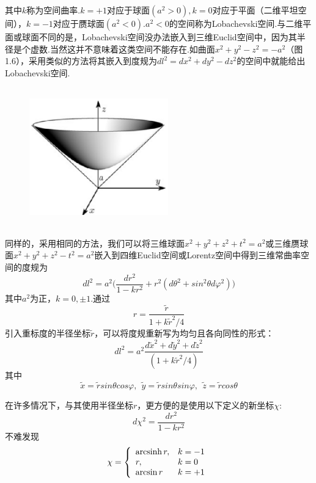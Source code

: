 \documentclass[a4paper]{book}
\begin{document}
其中$k$称为空间曲率.$k=+1$对应于球面$(a^2>0),$$k=0$对应于平面（二维平坦空间），$k=-1$对应于赝球面$(a^2<0)$.$a^2<0$的空间称为Lobachevski空间.与二维平面或球面不同的是，Lobachevski空间没办法嵌入到三维Euclid空间中，因为其半径是个虚数.当然这并不意味着这类空间不能存在.如曲面$x^2+y^2-z^2=-a^2$（图1.6），采用类似的方法将其嵌入到度规为$dl^2=dx^2+dy^2-dz^2$的空间中就能给出Lobachevski空间.
\begin{figure}[!h]
	\centering
	\includegraphics[width=6cm,height=6cm]{figures/双曲面.eps}
	\caption{}
\end{figure}\par 
同样的，采用相同的方法，我们可以将三维球面$x^2+y^2+z^2+t^2=a^2$或三维赝球面$x^2+y^2+z^2-t^2=a^2$嵌入到四维Euclid空间或Lorentz空间中得到三维常曲率空间的度规为
\begin{equation}\label{1.30}
	dl^2=a^2\Big(\frac{dr^2}{1-kr^2}+r^2(d\theta^2+sin^2\theta d\varphi^2)\Big)
\end{equation}
其中$a^2$为正，$k=0,\pm1$.通过
\begin{equation}
	r=\frac{\tilde{r}}{1+k\tilde{r}^2/4}
\end{equation}
引入重标度的半径坐标$\tilde{r}$，可以将度规重新写为均匀且各向同性的形式：
\begin{equation}
	dl^2=a^2\frac{d\tilde{x}^2+d\tilde{y}^2+d\tilde{z}^2}{(1+k\tilde{r}^2/4)}
\end{equation}
其中
\begin{equation}
	\tilde{x}=\tilde{r}sin\theta cos\varphi,~~	\tilde{y}=\tilde{r}sin\theta sin\varphi,~~\tilde{z}=\tilde{r}cos\theta
\end{equation}\par 
在许多情况下，与其使用半径坐标$r$，更方便的是使用以下定义的新坐标$\chi$:
\begin{equation}
	d\chi^2=\frac{dr^2}{1-kr^2}
\end{equation}
不难发现
\begin{equation}
	\chi=\left\{\begin{array}{l l}{{\mathrm{arcsinh}\,r,}}&{{k=-1}}\\ {{r,}}&{{k=0}}\\ {{\mathrm{arcsin}\,r}}&{{k=+1}}\end{array}\right.

\end{equation}$$
\end{document}
